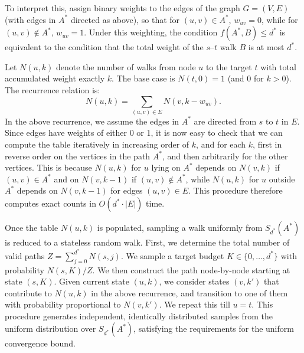 To interpret this, assign binary weights to the edges of the graph $G=(V, E)$ (with edges in $A^*$ directed as above), so that for $(u,v) \in A^*$, $w_{uv} = 0$, while for $(u,v) \notin A^*$, $w_{uv} = 1$.  Under this weighting, the condition $f(A^*, B) \le d^*$ is equivalent to the condition that the total weight of the $s$--$t$ walk $B$ is at most $d^*$. 

Let $N(u, k)$ denote the number of walks from node $u$ to the target $t$ with total accumulated weight exactly $k$. The base case is $N(t, 0) = 1$ (and $0$ for $k>0$). The recurrence relation is:
\[ N(u, k) = \sum_{(u, v) \in E} N(v, k - w_{uv}). \]
In the above recurrence, we assume the edges in $A^*$ are directed from $s$ to $t$ in $E$. Since edges have weights of either 0 or 1, it is now easy to check that we can compute the table iteratively in increasing order of $k$, and for each $k$, first in reverse order on the vertices in the path $A^*$, and then arbitrarily for the other vertices. This is because $N(u,k)$ for $u$ lying on $A^*$ depends on $N(v,k)$ if $(u,v) \in A^*$ and on $N(v,k-1)$ if $(u,v) \notin A^*$, while $N(u,k)$ for $u$ outside $A^*$ depends on $N(v,k-1)$ for edges $(u,v) \in E$. This procedure therefore computes exact counts in $O(d^* \cdot |E|)$ time.

Once the table $N(u, k)$ is populated, sampling a walk uniformly from $S_{d^*}(A^*)$ is reduced to a stateless random walk. First, we determine the total number of valid paths $Z = \sum_{j=0}^{d^*} N(s, j)$. We sample a target budget $K \in \{0, \dots, d^*\}$ with probability $N(s, K)/Z$.  We then construct the path node-by-node starting at state $(s,K)$. Given current state $(u,k)$, we consider states $(v,k')$ that contribute to $N(u,k)$ in the above recurrence, and transition to one of them with probability proportional to $N(v,k')$. We repeat this till $u = t$. This procedure generates independent, identically distributed samples from the uniform distribution over $S_{d^*}(A^*)$, satisfying the requirements for the uniform convergence bound. 


